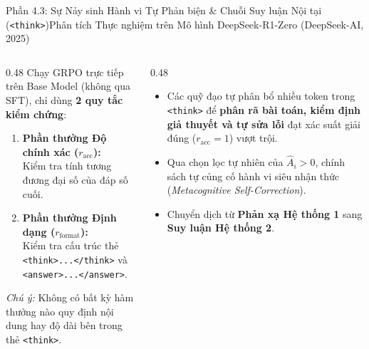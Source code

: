 \begin{frame}{Phần 4.3: Sự Nảy sinh Hành vi Tự Phản biện \& Chuỗi Suy luận Nội tại (\texttt{<think>})}{Phân tích Thực nghiệm trên Mô hình DeepSeek-R1-Zero (DeepSeek-AI, 2025)}
  \begin{columns}[T,onlytextwidth]
    \begin{column}{0.48\textwidth}
      \footnotesize
      Chạy GRPO trực tiếp trên Base Model (không qua SFT), chỉ dùng \textbf{2 quy tắc kiểm chứng}:
      \begin{enumerate}\setlength{\itemsep}{5pt}
        \item \textbf{Phần thưởng Độ chính xác ($r_{\text{acc}}$):}\\
          Kiểm tra tính tương đương đại số của đáp số cuối.
        \item \textbf{Phần thưởng Định dạng ($r_{\text{format}}$):}\\
          Kiểm tra cấu trúc thẻ \texttt{<think>...</think>} và \texttt{<answer>...</answer>}.
      \end{enumerate}
      \vspace{0.04cm}
      \scriptsize
      \textit{Chú ý:} Không có bất kỳ hàm thưởng nào quy định nội dung hay độ dài bên trong thẻ \texttt{<think>}.
    \end{column}
    \begin{column}{0.48\textwidth}
      \footnotesize
      \begin{itemize}\setlength{\itemsep}{5pt}
        \item Các quỹ đạo tự phân bổ nhiều token trong \texttt{<think>} để \textbf{phân rã bài toán, kiểm định giả thuyết và tự sửa lỗi} đạt xác suất giải đúng ($r_{\text{acc}} = 1$) vượt trội.
        \item Qua chọn lọc tự nhiên của $\hat{A}_i > 0$, chính sách tự củng cố hành vi siêu nhận thức (\textit{Metacognitive Self-Correction}).
        \item Chuyển dịch từ \textbf{Phản xạ Hệ thống 1} sang \textbf{Suy luận Hệ thống 2}.
      \end{itemize}
    \end{column}
  \end{columns}
\end{frame}

